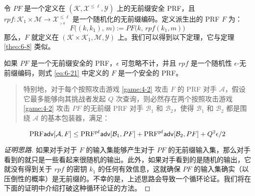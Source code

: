 \begin{snote}[使用 $rpf$。]
令 $PF$ 是一个定义在 $(\mathcal{K},\mathcal{X}^{\leq\ell},\mathcal{Y})$ 上的无前缀安全 PRF，且 $rpf:\mathcal{K}_1\times\mathcal{M}\to\mathcal{X}^{\leq\ell}_{_{>0}}$ 是一个随机化的无前缀编码。定义派生出的 PRF $F$ 为：
\begin{equation}\label{eq:6-21}
F\big((k,k_1),\,m\big):=PF\big(k,\,rpf(k_1,m)\big)
\end{equation}
那么，$F$ 就定义在 $(\mathcal{K}\times\mathcal{K}_1,\mathcal{M},\mathcal{Y})$ 上。我们可以得到以下定理，它与定理 \ref{theo:6-8} 类似。
\end{snote}

\begin{theorem}\label{theo:6-9}
如果 $PF$ 是一个无前缀安全的 PRF，$\epsilon$ 可忽略不计，并且 $rpf$ 是一个随机性 $\epsilon$-无前缀编码，则式 \ref{eq:6-21} 中定义的 $F$ 是一个安全的 PRF。
\begin{quote}
特别地，对于每个按照攻击游戏 \ref{game:4-2} 攻击 $F$ 的 PRF 对手 $\mathcal{A}$，假设它最多能够向其挑战者发起 $Q$ 次查询，则必然存在两个按照攻击游戏 \ref{game:4-2} 攻击 $PF$ 的无前缀 PRF 对手 $\mathcal{B}_1$ 和 $\mathcal{B}_2$，使得 $\mathcal{B}_1$ 和 $\mathcal{B}_2$ 都是围绕 $\mathcal{A}$ 的基本包装器，满足：
\end{quote}
\begin{equation}\label{eq:6-22}
{\rm PRF}\mathsf{adv}[\mathcal{A},F]\leq
{\rm PRF^{pf}}\mathsf{adv}[\mathcal{B}_1,PF]+{\rm PRF^{pf}}\mathsf{adv}[\mathcal{B}_2,PF]+{Q^2\epsilon}/{2}
\end{equation}
\end{theorem}

\begin{proof}[证明思路]
如果对手对于 $F$ 的输入集能够产生对于 $PF$ 的无前缀输入集，那么对手看到的就只是一些看起来很随机的输出。此外，如果对手看到的是随机的输出，它就没有得到关于 $rpf$ 的密钥 $k_1$ 的任何有效信息，这就确保 $PF$ 的输入集确实（以压倒性的概率）是无前缀的。不幸的是，上述思路会导致一个循环论证。我们将在下面的证明中介绍打破这种循环论证的方法。
\end{proof}

